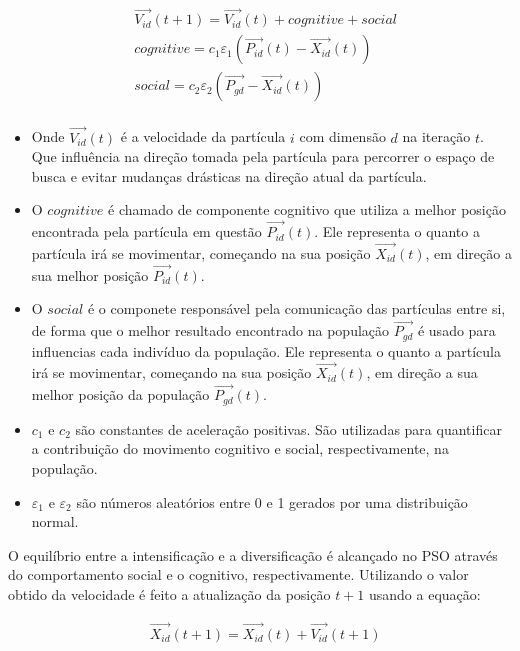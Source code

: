 \begin{equation}
\label{eq:pso_update_volocity}
\begin{split}
& \vec{V_{id}}(t + 1) = \vec{V_{id}}(t) + cognitive + social \\
& cognitive = c_1 \varepsilon_1 (\vec{P_{id}}(t) - \vec{X_{id}}(t)) \\
& social = c_2 \varepsilon_2 (\vec{P_{gd}} - \vec{X_{id}}(t)) \\
\end{split}
\end{equation}

\begin{itemize}
\item Onde $\vec{V_{id}}(t)$ é a velocidade da partícula $i$ com dimensão $d$ na iteração $t$. Que influência na direção tomada pela partícula para percorrer o espaço de busca e evitar mudanças drásticas na direção atual da partícula.

\item O $cognitive$ é chamado de componente cognitivo que utiliza a melhor posição encontrada pela partícula em questão $\vec{P_{id}}(t)$. Ele representa o quanto a partícula irá se movimentar, começando na sua posição $\vec{X_{id}}(t)$, em direção a sua melhor posição $\vec{P_{id}}(t)$.

\item O $social$ é o componete responsável pela comunicação das partículas entre si, de forma que o melhor resultado encontrado na população $\vec{P_{gd}}$ é usado para influencias cada indivíduo da população. Ele representa o quanto a partícula irá se movimentar, começando na sua posição $\vec{X_{id}}(t)$, em direção a sua melhor posição da população $\vec{P_{gd}}(t)$.

\item $c_1$ e $c_2$ são constantes de aceleração positivas. São utilizadas para quantificar a contribuição do movimento cognitivo e social, respectivamente, na população.

\item $\varepsilon_1$ e $\varepsilon_2$ são números aleatórios entre 0 e 1 gerados por uma distribuição normal.
\end{itemize}

O equilíbrio entre a intensificação e a diversificação é alcançado no PSO através do comportamento social e o cognitivo, respectivamente. Utilizando o valor obtido da velocidade é feito a atualização da posição $t + 1$ usando a equação:

\begin{equation}
\label{eq:pso_update_position}
\begin{split}
& \vec{X_{id}}(t + 1) = \vec{X_{id}}(t) + \vec{V_{id}}(t + 1) \\
\end{split}
\end{equation}


